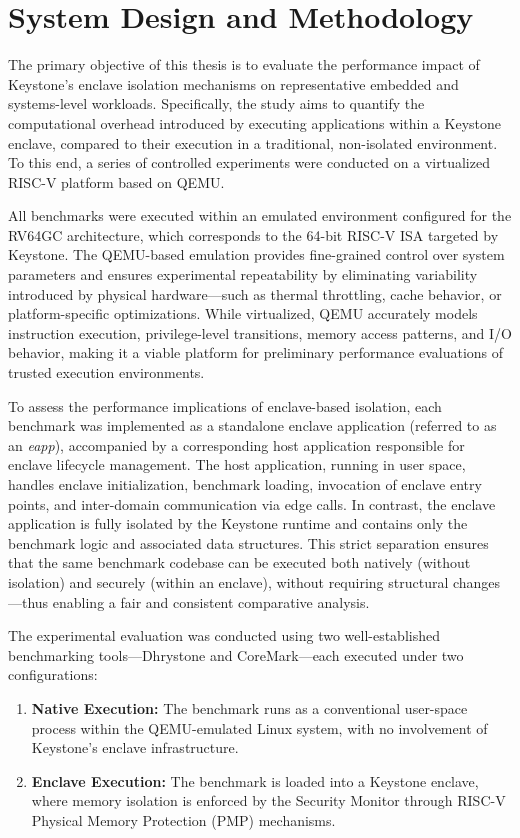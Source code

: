 \chapter{System Design and Methodology}
\label{chap:methodology}

The primary objective of this thesis is to evaluate the performance impact of Keystone’s enclave isolation mechanisms on representative embedded and systems-level workloads. Specifically, the study aims to quantify the computational overhead introduced by executing applications within a Keystone enclave, compared to their execution in a traditional, non-isolated environment. To this end, a series of controlled experiments were conducted on a virtualized RISC-V platform based on QEMU.

All benchmarks were executed within an emulated environment configured for the RV64GC architecture, which corresponds to the 64-bit RISC-V ISA targeted by Keystone. The QEMU-based emulation provides fine-grained control over system parameters and ensures experimental repeatability by eliminating variability introduced by physical hardware—such as thermal throttling, cache behavior, or platform-specific optimizations. While virtualized, QEMU accurately models instruction execution, privilege-level transitions, memory access patterns, and I/O behavior, making it a viable platform for preliminary performance evaluations of trusted execution environments.

To assess the performance implications of enclave-based isolation, each benchmark was implemented as a standalone enclave application (referred to as an \textit{eapp}), accompanied by a corresponding host application responsible for enclave lifecycle management. The host application, running in user space, handles enclave initialization, benchmark loading, invocation of enclave entry points, and inter-domain communication via edge calls. In contrast, the enclave application is fully isolated by the Keystone runtime and contains only the benchmark logic and associated data structures. This strict separation ensures that the same benchmark codebase can be executed both natively (without isolation) and securely (within an enclave), without requiring structural changes—thus enabling a fair and consistent comparative analysis.

The experimental evaluation was conducted using two well-established benchmarking tools—Dhrystone and CoreMark—each executed under two configurations:

\begin{enumerate}
\item \textbf{Native Execution:} The benchmark runs as a conventional user-space process within the QEMU-emulated Linux system, with no involvement of Keystone's enclave infrastructure.
\item \textbf{Enclave Execution:} The benchmark is loaded into a Keystone enclave, where memory isolation is enforced by the Security Monitor through RISC-V Physical Memory Protection (PMP) mechanisms.
\end{enumerate}

